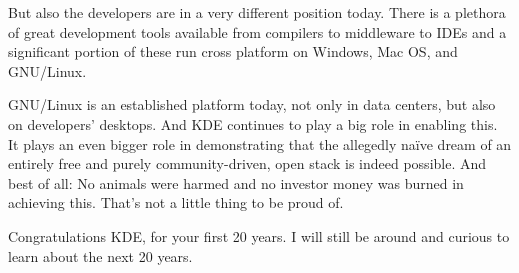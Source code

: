 But also the developers are in a very different position today. There is a plethora of great development tools available from compilers to middleware to IDEs and a significant portion of these run cross platform on Windows, Mac OS, and GNU/Linux.
 
GNU/Linux is an established platform today, not only in data centers, but also on developers’ desktops. And KDE continues to play a big role in enabling this. It plays an even bigger role in demonstrating that the allegedly naïve dream of an entirely free and purely community-driven, open stack is indeed possible. And best of all: No animals were harmed and no investor money was burned in achieving this. That's not a little thing to be proud of.
 
Congratulations KDE, for your first 20 years. I will still be around and curious to learn about the next 20 years.